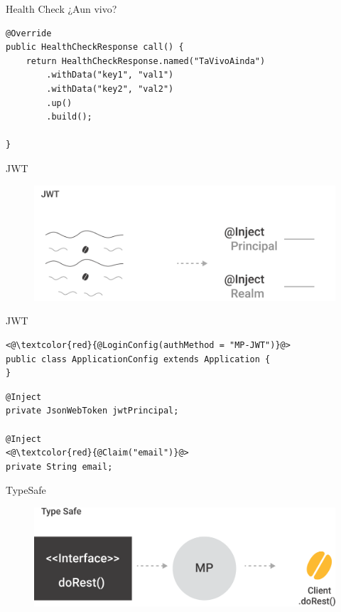 \documentclass{beamer}
\begin{document}
\begin{frame}[fragile]{Health Check}
¿Aun vivo?
\begin{lstlisting}
@Override
public HealthCheckResponse call() {
	return HealthCheckResponse.named("TaVivoAinda")
		.withData("key1", "val1")
		.withData("key2", "val2")
		.up()
		.build();

}
\end{lstlisting}

\end{frame}


\begin{frame}{JWT}
\begin{figure}
	\centering
	\includegraphics[width=0.9\linewidth]{Images/jwt}
\end{figure}
\end{frame}


\begin{frame}[fragile]{JWT}

\begin{lstlisting}
<@\textcolor{red}{@LoginConfig(authMethod = "MP-JWT")}@>
public class ApplicationConfig extends Application {
}
\end{lstlisting}

\begin{lstlisting}
@Inject
private JsonWebToken jwtPrincipal;

@Inject
<@\textcolor{red}{@Claim("email")}@>
private String email;
\end{lstlisting}
\end{frame}

\begin{frame}{TypeSafe}
\begin{figure}
	\centering
	\includegraphics[width=0.75\linewidth]{Images/typesafe}
\end{figure}
\end{frame}
\end{document}
